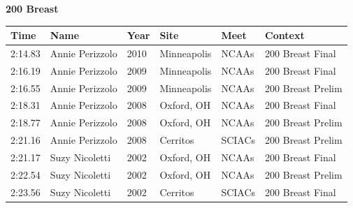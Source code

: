 \vspace{1.2em}
\noindent\begin{minipage}[t]{0.98\textwidth}
\centering
\textbf{\textcolor{teamprimary}{200 Breast}}\par
\vspace{0.5em}
\centering
\small
\renewcommand{\arraystretch}{1.0}
\setlength{\tabcolsep}{4pt}
\begin{tabular}{@{}p{2.0cm}p{3.2cm}p{1.2cm}p{2.0cm}p{2.0cm}p{2.5cm}@{}}
\toprule
\textbf{Time} & \textbf{Name} & \textbf{Year} & \textbf{Site} & \textbf{Meet} & \textbf{Context} \\
\midrule
2:14.83 & Annie Perizzolo & 2010 & Minneapolis & NCAAs & 200 Breast Final \\
2:16.19 & Annie Perizzolo & 2009 & Minneapolis & NCAAs & 200 Breast Final \\
2:16.55 & Annie Perizzolo & 2009 & Minneapolis & NCAAs & 200 Breast Prelim \\
2:18.31 & Annie Perizzolo & 2008 & Oxford, OH & NCAAs & 200 Breast Final \\
2:18.77 & Annie Perizzolo & 2008 & Oxford, OH & NCAAs & 200 Breast Prelim \\
2:21.16 & Annie Perizzolo & 2008 & Cerritos & SCIACs & 200 Breast Prelim \\
2:21.17 & Suzy Nicoletti & 2002 & Oxford, OH & NCAAs & 200 Breast Final \\
2:22.54 & Suzy Nicoletti & 2002 & Oxford, OH & NCAAs & 200 Breast Prelim \\
2:23.56 & Suzy Nicoletti & 2002 & Cerritos & SCIACs & 200 Breast Final \\
\bottomrule
\end{tabular}
\end{minipage}
\vspace{1.2em}
